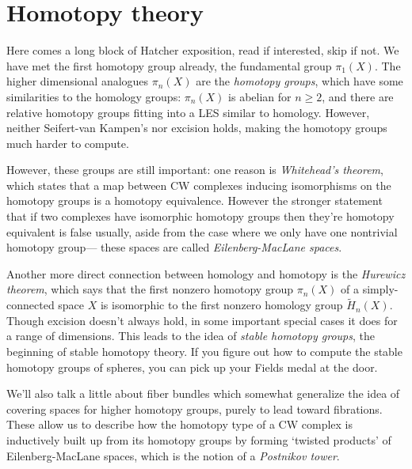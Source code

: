 \section{Homotopy theory} 
Here comes a long block of Hatcher exposition, read if interested, skip if not.
\orbreak
We have met the first homotopy group already, the fundamental group $\pi_1(X)$. The higher dimensional analogues $\pi_n (X)$ are the \emph{homotopy groups}, which have some similarities to the homology groups: $\pi_n (X)$ is abelian for $n\geq 2$, and there are relative homotopy groups fitting into a LES similar to homology. However, neither Seifert-van Kampen's nor excision holds, making the homotopy groups much harder to compute. 

However, these groups are still important: one reason is \emph{Whitehead's theorem}, which states that a map between CW complexes inducing isomorphisms on the homotopy groups is a homotopy equivalence. However the stronger statement that if two complexes have isomorphic homotopy groups then they're homotopy equivalent is false usually, aside from the case where we only have one nontrivial homotopy group— these spaces are called \emph{Eilenberg-MacLane spaces}.

Another more direct connection between homology and homotopy is the \emph{Hurewicz theorem}, which says that the first nonzero homotopy group $\pi_n (X)$ of a simply-connected space $X$ is isomorphic to the first nonzero homology group $\widetilde H_n (X)$. Though excision doesn't always hold, in some important special cases it does for a range of dimensions. This leads to the idea of \emph{stable homotopy groups}, the beginning of stable homotopy theory. If you figure out how to compute the stable homotopy groups of spheres, you can pick up your Fields medal at the door.

We'll also talk a little about fiber bundles which somewhat generalize the idea of covering spaces for higher homotopy groups, purely to lead toward fibrations. These allow us to describe how the homotopy type of a CW complex is inductively built up from its homotopy groups by forming `twisted products' of Eilenberg-MacLane spaces, which is the notion of a \emph{Postnikov tower}.
\orbreak

